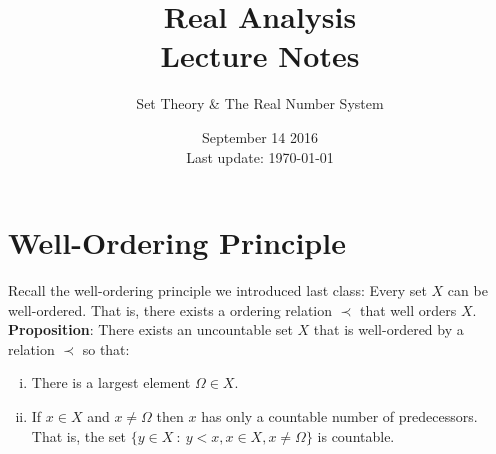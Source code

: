 \documentclass[12pt]{article}
\newlength\tindent
\renewcommand{\indent}{\hspace*{\tindent}}
\begin{document}
 
 
\title{Real Analysis\\Lecture Notes}
\author{Set Theory \& The Real Number System}
\date{September 14 2016 \\ Last update: \today{}}
\maketitle

\section{Well-Ordering Principle}

\indent Recall the well-ordering principle we introduced last class: Every set $X$ can be well-ordered. That is, there exists a ordering relation $\prec$ that well orders $X$. \\

{\bf Proposition}: There exists an uncountable set $X$ that is well-ordered by a relation $\prec$ so that:
\begin{enumerate}[(i)]
	\item There is a largest element $\Omega \in X$.
	\item If $x \in X$ and $x \neq \Omega$ then $x$ has only a countable number of predecessors. That is, the set $\{y \in X ~:~ y < x, x \in X, x \neq \Omega\}$ is countable.
\end{enumerate}
\end{document}
